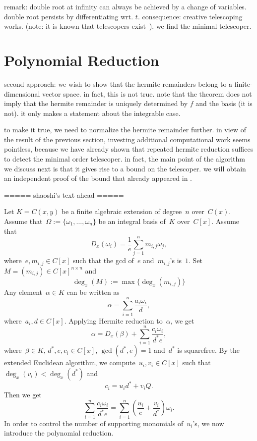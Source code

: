 \documentclass{sig-alternate}
\newtheorem{lemma}[theorem]{Lemma}
\newcommand{\red}{\color{red}}
\begin{document}
remark: double root at infinity can always be achieved by a change of variables.
double root persists by differentiating wrt. $t$. consequence: creative telescoping works.
(note: it is known that telescopers exist~\cite{zeilberger90,chyzak00}).
we find the minimal telescoper.

\section{Polynomial Reduction}\label{sec:polynomial}

second approach: we wish to show that the hermite remainders belong to a finite-dimensional
vector space. in fact, this is not true.
note that the theorem does not imply that the hermite remainder is uniquely determined by
$f$ and the basis (it is not). it only makes a statement about the integrable case.

to make it true, we need to normalize the hermite remainder further. in view of the result
of the previous section, investing additional computational work seems pointless, because we have
already shown that repeated hermite reduction suffices to detect the minimal order telescoper.
in fact, the main point of the algorithm we discuss next is that it gives rise to a bound on
the telescoper. we will obtain an independent proof of the bound that already appeared in \cite{chen14a}.

===== shaoshi's text ahead =====

Let $K= C(x, y)$ be a finite algebraic extension of degree~$n$ over~$C(x)$.
Assume that~$\Omega:=\{\omega_1, \ldots, \omega_n\}$ be an integral basis of~$K$
over~$C[x]$.  Assume that
\[D_x(\omega_i) = \frac{1}{e}\sum_{j=1}^n m_{i, j}\omega_j,\]
where~$e, m_{i, j}\in C[x]$ such that the gcd of~$e$ and~$m_{i,j}$'s is~$1$.
Set~$M=(m_{i, j})\in C[x]^{n\times n}$
and
\[\deg_x(M):= \max\{\deg_x(m_{i, j})\}\]
Any element~$\alpha\in K$ can be written as
\[\alpha = \sum_{i=1}^n \frac{a_i\omega_i}{d},\]
where~$a_i, d\in C[x]$. Applying Hermite reduction to~$\alpha$, we get
\[\alpha = D_x(\beta) + \sum_{i=1}^n \frac{c_i\omega_i}{d^*e},\]
where~$\beta\in K$, $d^*, e, c_i\in C[x]$, $\gcd(d^*, e)=1$ and~$d^*$ is squarefree.
By the extended Euclidean algorithm, we compute~$u_i, v_i\in C[x]$ such that
$\deg_x(v_i) < \deg_x(d^*)$ and
\[c_i = u_i d^* + v_i Q.\]
Then we get
\[ \sum_{i=1}^n \frac{c_i\omega_i}{d^*e} =  \sum_{i=1}^n \left(\frac{u_i}{e} + \frac{v_i}{d^*}\right)\omega_i.\]
In order to control the number of supporting monomials of~$u_i$'s, we now introduce the polynomial reduction.
\end{document}
